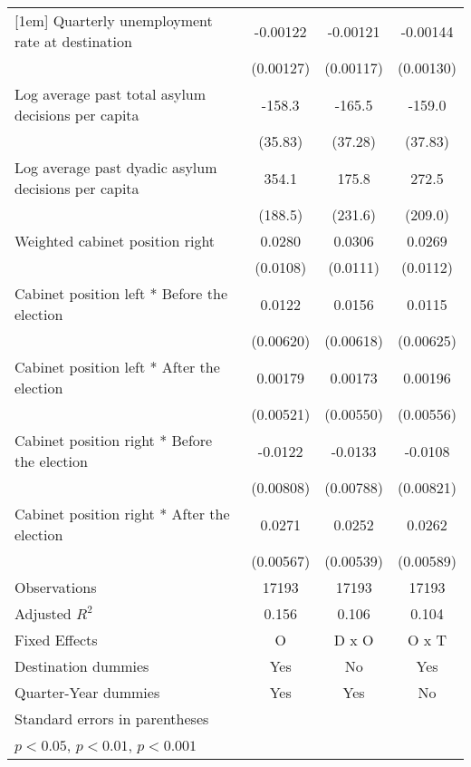 \begin{table}[htbp]
\begin{tabular}{l*{3}{c}}
[1em]
Quarterly unemployment rate at destination&    -0.00122         &    -0.00121         &    -0.00144         \\
                    &   (0.00127)         &   (0.00117)         &   (0.00130)         \\
[1em]
Log average past total asylum decisions per capita&      -158.3\sym{***}&      -165.5\sym{***}&      -159.0\sym{***}\\
                    &     (35.83)         &     (37.28)         &     (37.83)         \\
[1em]
Log average past dyadic asylum decisions per capita&       354.1         &       175.8         &       272.5         \\
                    &     (188.5)         &     (231.6)         &     (209.0)         \\
[1em]
Weighted cabinet position right&      0.0280\sym{*}  &      0.0306\sym{**} &      0.0269\sym{*}  \\
                    &    (0.0108)         &    (0.0111)         &    (0.0112)         \\
[1em]
Cabinet position left * Before the election&      0.0122         &      0.0156\sym{*}  &      0.0115         \\
                    &   (0.00620)         &   (0.00618)         &   (0.00625)         \\
[1em]
Cabinet position left * After the election&     0.00179         &     0.00173         &     0.00196         \\
                    &   (0.00521)         &   (0.00550)         &   (0.00556)         \\
[1em]
Cabinet position right * Before the election&     -0.0122         &     -0.0133         &     -0.0108         \\
                    &   (0.00808)         &   (0.00788)         &   (0.00821)         \\
[1em]
Cabinet position right * After the election&      0.0271\sym{***}&      0.0252\sym{***}&      0.0262\sym{***}\\
                    &   (0.00567)         &   (0.00539)         &   (0.00589)         \\
\hline
Observations        &       17193         &       17193         &       17193         \\
Adjusted \(R^{2}\)  &       0.156         &       0.106         &       0.104         \\
Fixed Effects       &           O         &       D x O         &       O x T         \\
Destination dummies &         Yes         &          No         &         Yes         \\
Quarter-Year dummies&         Yes         &         Yes         &          No         \\
\hline\hline
\multicolumn{4}{l}{\footnotesize Standard errors in parentheses}\\
\multicolumn{4}{l}{\footnotesize \sym{*} \(p<0.05\), \sym{**} \(p<0.01\), \sym{***} \(p<0.001\)}\\
\end{tabular}
\end{table}

